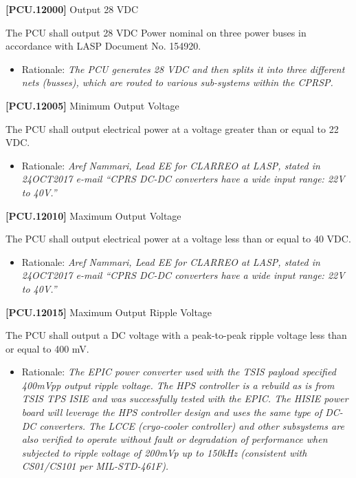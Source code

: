 \textbf{[PCU.12000]} Output 28 \gls{VDC}

The \gls{PCU} shall output 28 \gls{VDC} Power nominal on three power buses in accordance with \gls{LASP} Document No. 154920.

\begin{itemize}
\item{} Rationale: \emph{The PCU generates 28 VDC and then splits it into three different nets (busses), which are routed to various sub-systems within the CPRSP.}

\end{itemize}

\textbf{[PCU.12005]} Minimum Output Voltage

The \gls{PCU} shall output electrical power at a voltage greater than or equal to 22 \gls{VDC}.

\begin{itemize}
\item{} Rationale: \emph{Aref Nammari, Lead EE for CLARREO at LASP, stated in 24OCT2017 e-mail ``CPRS DC-DC converters have a wide input range: 22V to 40V.''}

\end{itemize}

\textbf{[PCU.12010]} Maximum Output Voltage

The \gls{PCU} shall output electrical power at a voltage less than or equal to 40 \gls{VDC}.

\begin{itemize}
\item{} Rationale: \emph{Aref Nammari, Lead EE for CLARREO at LASP, stated in 24OCT2017 e-mail ``CPRS DC-DC converters have a wide input range: 22V to 40V.''}

\end{itemize}

\textbf{[PCU.12015]} Maximum Output Ripple Voltage

The \gls{PCU} shall output a DC voltage with a peak-to-peak ripple voltage less than or equal to 400 mV.

\begin{itemize}
\item{} Rationale: \emph{The EPIC power converter used with the TSIS payload specified 400mVpp output ripple voltage. The HPS controller is a rebuild as is from TSIS TPS ISIE and was successfully tested with the EPIC. The HISIE power board will leverage the HPS controller design and uses the same type of DC-DC converters. The LCCE (cryo-cooler controller) and other subsystems are also verified to operate without fault or degradation of performance when subjected to ripple voltage of 200mVp up to 150kHz (consistent with CS01\slash CS101 per MIL-STD-461F).}

\end{itemize}

